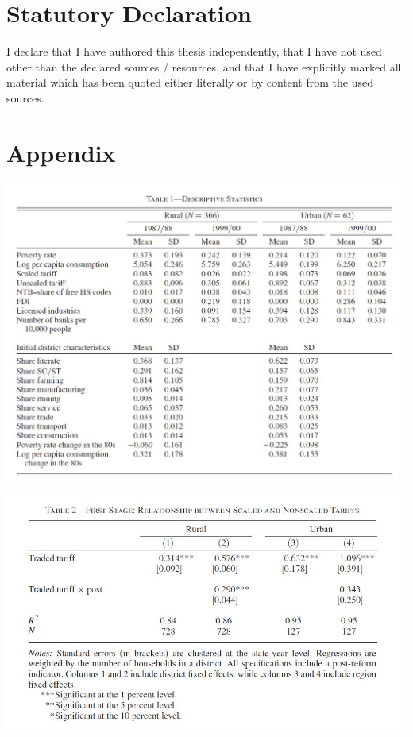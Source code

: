 \documentclass[a4paper,12pt]{article}
\begin{document}
\newpage



\newpage
\section{Statutory Declaration}
I declare that I have authored this thesis independently, that I have not used other than the declared sources / resources, and that I have explicitly marked all material which has been quoted either literally or by content from the used sources.

\newpage
\section{Appendix}
\begin{table}[h]
\centering
\includegraphics[width=1\textwidth]{Tbale1.JPG}
\caption{\label{fig:Figure1}}
\end{table}

\begin{table}[h]
\centering
\includegraphics[width=1\textwidth]{table2.JPG}
\caption{\label{fig:Figure1}}
\end{table}
\end{document}
